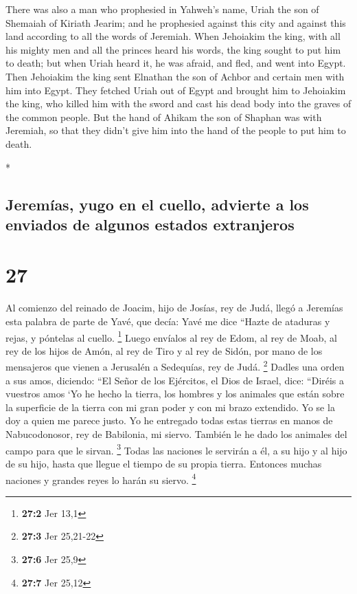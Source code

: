 \begin{paracol}{2}
\begin{otherlanguage}{english}
 There was also a man who prophesied in Yahweh's name,
Uriah the son of Shemaiah of Kiriath Jearim; and he prophesied against
this city and against this land according to all the words of Jeremiah.
 When Jehoiakim the king, with all his mighty men and all
the princes heard his words, the king sought to put him to death; but
when Uriah heard it, he was afraid, and fled, and went into Egypt.
 Then Jehoiakim the king sent Elnathan the son of Achbor
and certain men with him into Egypt.  They fetched Uriah
out of Egypt and brought him to Jehoiakim the king, who killed him with
the sword and cast his dead body into the graves of the common people.
 But the hand of Ahikam the son of Shaphan was with
Jeremiah, so that they didn't give him into the hand of the people to
put him to death.

\end{otherlanguage}

\switchcolumn[0]*

\hypertarget{jeremuxedas-yugo-en-el-cuello-advierte-a-los-enviados-de-algunos-estados-extranjeros}{%
\subsection{Jeremías, yugo en el cuello, advierte a los enviados de
algunos estados
extranjeros}\label{jeremuxedas-yugo-en-el-cuello-advierte-a-los-enviados-de-algunos-estados-extranjeros}}

\hypertarget{section-52}{%
\section{27}\label{section-52}}

 Al comienzo del reinado de Joacim, hijo de Josías, rey de
Judá, llegó a Jeremías esta palabra de parte de Yavé, que decía:
 Yavé me dice ``Hazte de ataduras y rejas, y póntelas al
cuello. \footnote{\textbf{27:2} Jer 13,1}  Luego envíalos
al rey de Edom, al rey de Moab, al rey de los hijos de Amón, al rey de
Tiro y al rey de Sidón, por mano de los mensajeros que vienen a
Jerusalén a Sedequías, rey de Judá. \footnote{\textbf{27:3} Jer 25,21-22}
 Dadles una orden a sus amos, diciendo: ``El Señor de los
Ejércitos, el Dios de Israel, dice: ``Diréis a vuestros amos
 `Yo he hecho la tierra, los hombres y los animales que
están sobre la superficie de la tierra con mi gran poder y con mi brazo
extendido. Yo se la doy a quien me parece justo.  Yo he
entregado todas estas tierras en manos de Nabucodonosor, rey de
Babilonia, mi siervo. También le he dado los animales del campo para que
le sirvan. \footnote{\textbf{27:6} Jer 25,9}  Todas las
naciones le servirán a él, a su hijo y al hijo de su hijo, hasta que
llegue el tiempo de su propia tierra. Entonces muchas naciones y grandes
reyes lo harán su siervo. \footnote{\textbf{27:7} Jer 25,12}


\end{paracol}
